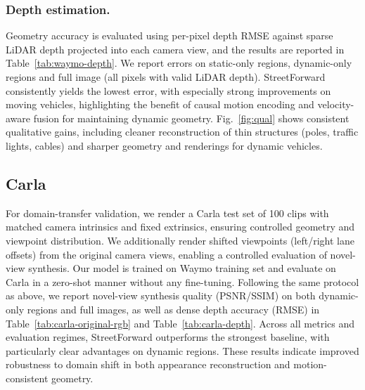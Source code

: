 



\subsubsection{Depth estimation.}
Geometry accuracy is evaluated using per-pixel depth RMSE against sparse LiDAR depth projected into each camera view, and the results are reported in Table~\ref{tab:waymo-depth}.
We report errors on static-only regions, dynamic-only regions and full image (all pixels with valid LiDAR depth). StreetForward consistently yields the lowest error, with especially strong improvements on moving vehicles, highlighting the benefit of causal motion encoding and velocity-aware fusion for maintaining dynamic geometry. Fig.~\ref{fig:qual} shows consistent qualitative gains, including cleaner reconstruction of thin structures (poles, traffic lights, cables) and sharper geometry and renderings for dynamic vehicles.



\subsection{Carla}\label{sec:exp-carla}
For domain-transfer validation, we render a Carla test set of 100 clips with matched camera intrinsics and fixed extrinsics, ensuring controlled geometry and viewpoint distribution. 
We additionally render shifted viewpoints (left/right lane offsets) from the original camera views, enabling a controlled evaluation of novel-view synthesis.
Our model is trained on Waymo training set and evaluate on Carla in a zero-shot manner without any fine-tuning. 
Following the same protocol as above, we report novel-view synthesis quality (PSNR/SSIM) on both dynamic-only regions and full images, as well as dense depth accuracy (RMSE) in Table~\ref{tab:carla-original-rgb} and Table~\ref{tab:carla-depth}. Across all metrics and evaluation regimes, StreetForward outperforms the strongest baseline, with particularly clear advantages on dynamic regions. These results indicate improved robustness to domain shift in both appearance reconstruction and motion-consistent geometry.



